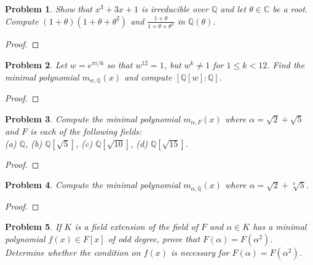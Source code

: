 \documentclass[10pt]{article}
\newcommand{\sk}{\vskip 10mm}
\theoremstyle{plain}
\newtheorem{problem}{Problem}
\theoremstyle{remark}
\begin{document}
\begin{problem}
  Show that $x^3 + 3x+1$ is irreducible over $\mathbb{Q}$ and let
  $\theta \in \mathbb{C}$ be a root. Compute $(1 + \theta)(1+\theta+\theta^2)$
  and $\frac{1 + \theta}{1 + \theta + \theta^2}$ in $\mathbb{Q}(\theta)$.
\end{problem}

\begin{proof}
  
\end{proof}

\sk

\begin{problem}
  Let $w = e^{\pi i /6}$ so that $w^{12} = 1$, but $w^k \neq 1$
  for $1 \leq k < 12$. Find the minimal polynomial $m_{w,\mathbb{Q}}(x)$
  and compute $[\mathbb{Q}[w]:\mathbb{Q}]$.
\end{problem}

\begin{proof}
  
\end{proof}

\sk

\begin{problem}
  Compute the minimal polynomial $m_{\alpha,F}(x)$ where
  $\alpha = \sqrt{2} + \sqrt{5}$ and $F$ is each of the following fields:\\
  (a) $\mathbb{Q}$, \hspace{1cm} (b)
  $\mathbb{Q}[\sqrt{5}]$, \hspace{1cm} (c) $\mathbb{Q}[\sqrt{10}]$,
  \hspace{1cm} (d) $\mathbb{Q}[\sqrt{15}]$.
\end{problem}

\begin{proof}
  
\end{proof}

\sk

\begin{problem}
  Compute the minimal polynomial $m_{\alpha, \mathbb{Q}}(x)$
  where $\alpha = \sqrt{2} + \sqrt[3]{5}$.
\end{problem}

\begin{proof}
  
\end{proof}

\sk

\begin{problem}
  If $K$ is a field extension of the field of $F$ and
  $\alpha \in K$ has a minimal polynomial $f(x) \in F[x]$ of odd degree,
  prove that $F(\alpha) = F(\alpha^2)$. Determine whether the condition
  on $f(x)$ is necessary for $F(\alpha) = F(\alpha^2)$.
\end{problem}
\end{document}
